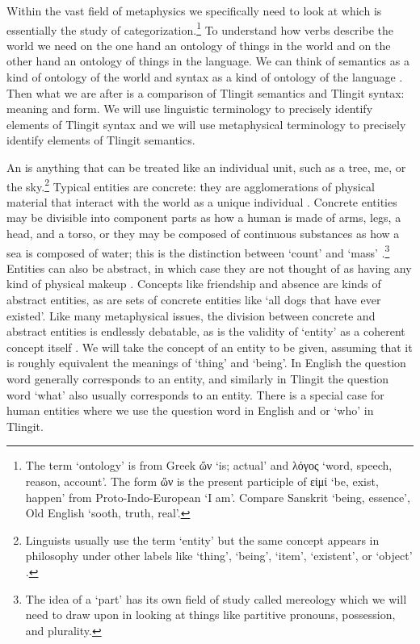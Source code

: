 Within the vast field of metaphysics we specifically need to look at  which is essentially the study of categorization.\footnote{The term ‘ontology’ is from Greek ὤν  ‘is; actual’ and λόγος  ‘word, speech, reason, account’. The form ὤν  is the present participle of εἰμί  ‘be, exist, happen’ from Proto-Indo-European  ‘I am’. Compare Sanskrit  ‘being, essence’, Old English  ‘sooth, truth, real’.} To understand how verbs describe the world we need on the one hand an ontology of things in the world and on the other hand an ontology of things in the language. We can think of semantics as a kind of ontology of the world and syntax as a kind of ontology of the language  \parencites{montague:1969}. Then what we are after is a comparison of Tlingit semantics and Tlingit syntax: meaning and form. We will use linguistic terminology to precisely identify elements of Tlingit syntax and we will use metaphysical terminology to precisely identify elements of Tlingit semantics.

An  is anything that can be treated like an individual unit, such as a tree, me, or the sky.\footnote{Linguists usually use the term ‘entity’ but the same concept appears in philosophy under other labels like ‘thing’, ‘being’, ‘item’, ‘existent’, or ‘object’ \parencite{rettler-bailey:2017}.} Typical entities are concrete: they are agglomerations of physical material that interact with the world as a unique individual \parencite{rettler-bailey:2017}. Concrete entities may be divisible into component parts as how a human is made of arms, legs, a head, and a torso, or they may be composed of continuous substances as how a sea is composed of water; this is the distinction between ‘count’ and ‘mass’ \parencites{steen:2016}{nicolas:2018}.\footnote{The idea of a ‘part’ has its own field of study called mereology \parencite{varzi:2019} which we will need to draw upon in looking at things like partitive pronouns, possession, and plurality.} Entities can also be abstract, in which case they are not thought of as having any kind of physical makeup \parencite{rosen:2020}. Concepts like friendship and absence are kinds of abstract entities, as are sets of concrete entities like ‘all dogs that have ever existed’. Like many metaphysical issues, the division between concrete and abstract entities is endlessly debatable, as is the validity of ‘entity’ as a coherent concept itself \parencites{casati:2004}{rettler-bailey:2017}{rosen:2020}. We will take the concept of an entity to be given, assuming that it is roughly equivalent the meanings of ‘thing’ and ‘being’. In English the question word  generally corresponds to an entity, and similarly in Tlingit the question word  ‘what’ also usually corresponds to an entity. There is a special case for human entities where we use the question word  in English and  or  ‘who’ in Tlingit.

